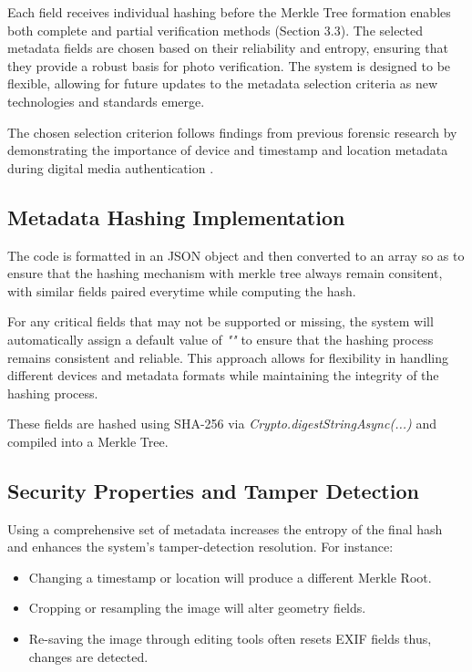 Each field receives individual hashing before the Merkle Tree formation enables both complete and partial verification methods (Section 3.3).
The selected metadata fields are chosen based on their reliability and entropy, ensuring that they provide a robust basis for photo verification. The system is designed to be flexible, allowing for future updates to the metadata selection criteria as new technologies and standards emerge.

The chosen selection criterion follows findings from previous forensic research by demonstrating the importance of device and timestamp and location metadata during digital media authentication \cite{authenticationOfDigitalImageExifMetadata} \cite{authenticationOfDigitalImageJpegHeaders}.

\subsection{Metadata Hashing Implementation}
The code is formatted in an JSON object and then converted to an array so as to ensure that the hashing mechanism with merkle tree always remain consitent, with similar fields paired everytime while computing the hash. 

For any critical fields that may not be supported or missing, the system will automatically assign a default value of \textit{""} to ensure that the hashing process remains consistent and reliable. This approach allows for flexibility in handling different devices and metadata formats while maintaining the integrity of the hashing process.



These fields are hashed using SHA-256 via \textit{Crypto.digestStringAsync(...)} and compiled into a Merkle Tree.



\subsection{Security Properties and Tamper Detection}
Using a comprehensive set of metadata increases the entropy of the final hash and enhances the system’s tamper-detection resolution. For instance:
\begin{itemize}
    \item Changing a timestamp or location will produce a different Merkle Root.
    \item Cropping or resampling the image will alter geometry fields.
    \item Re-saving the image through editing tools often resets EXIF fields thus, changes are detected.
\end{itemize}


